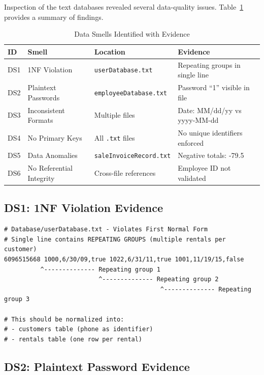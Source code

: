 Inspection of the text databases revealed several data-quality issues.
Table~\ref{tab:data-smells} provides a summary of findings.

\begin{table}[h]
  \centering
  \caption{Data Smells Identified with Evidence}
  \label{tab:data-smells}
  \begin{tabular}{p{1cm} p{3.5cm} p{4cm} p{4.5cm}}
    \toprule
    \textbf{ID} & \textbf{Smell} & \textbf{Location} & \textbf{Evidence} \\
    \midrule
    DS1 & 1NF Violation & \texttt{userDatabase.txt} & Repeating groups in single line \\
    DS2 & Plaintext Passwords & \texttt{employeeDatabase.txt} & Password ``1'' visible in file \\
    DS3 & Inconsistent Formats & Multiple files & Date: MM/dd/yy vs yyyy-MM-dd \\
    DS4 & No Primary Keys & All \texttt{.txt} files & No unique identifiers enforced \\
    DS5 & Data Anomalies & \texttt{saleInvoiceRecord.txt} & Negative totals: -79.5 \\
    DS6 & No Referential Integrity & Cross-file references & Employee ID not validated \\
    \bottomrule
  \end{tabular}
\end{table}

\subsection{DS1: 1NF Violation Evidence}

\begin{lstlisting}
# Database/userDatabase.txt - Violates First Normal Form
# Single line contains REPEATING GROUPS (multiple rentals per customer)
6096515668 1000,6/30/09,true 1022,6/31/11,true 1001,11/19/15,false
          ^-------------- Repeating group 1
                          ^-------------- Repeating group 2
                                           ^-------------- Repeating group 3

# This should be normalized into:
# - customers table (phone as identifier)
# - rentals table (one row per rental)
\end{lstlisting}

\subsection{DS2: Plaintext Password Evidence}

